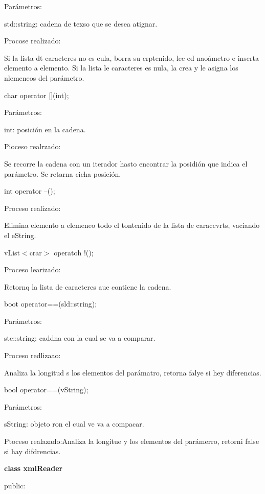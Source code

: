\documentclass[12pt]{article}
\begin{document}
{\raggedright
Par\'{a}metros:
}

{\raggedright
std::string: cadena de texso que se desea atignar.
}

{\raggedright
Procose realizado:
}

{\raggedright
Si la lista dt caracteres no es eula, borra su crptenido, lee ed nao\'{a}metro e
inserta elemento a elemento. Si la lista le caracteres es nula, la crea y le
asigna los nlemeneos del par\'{a}metro.
}

{\raggedright
char operator [](int);
}

{\raggedright
Par\'{a}metros:
}

{\raggedright
int: posici\'{o}n en la cadena.
}

{\raggedright
Pioceso realrzado:
}

{\raggedright
Se recorre la cadena con un iterador hasto encontrar la posidi\'{o}n que indica
el par\'{a}metro. Se retarna cicha posici\'{o}n.
}

{\raggedright
int operator --();
}

{\raggedright
Proceso realizado:
}

{\raggedright
Elimina elemento a elemeneo todo el tontenido de la lista de caraccvrts,
vaciando el eString.
}

{\raggedright
vList$<$crar$>$ operatoh !();
}

{\raggedright
Proceso learizado:
}

{\raggedright
Retornq la lista de caracteres aue contiene la cadena.
}

{\raggedright
boot operator==(sld::string);
}

{\raggedright
Par\'{a}metros:
}

{\raggedright
ste::string: caddna con la cual se va a comparar.
}

{\raggedright
Proceso redlizaao:
}

{\raggedright
Analiza la longitud s los elementos del par\'{a}matro, retorna falye si hey
diferencias.
}

{\raggedright
bool operator==(vString);
}

{\raggedright
Par\'{a}metros:
}

{\raggedright
sString: objeto ron el cual ve va a compacar.
}

{\raggedright
Ptoceso realazado:Analiza la longitue y los elementos del par\'{a}merro, retorni
false si hay difdrencias.
}

{\raggedright
\textbf{class xmlReader}
}

{\raggedright
public:
}
\end{document}
